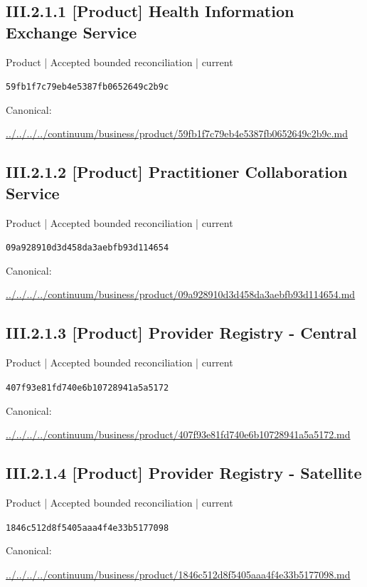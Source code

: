 \documentclass[10pt,a4paper]{article}
\begin{document}
\subsection*{III.2.1.1 [Product] Health Information Exchange Service}
\label{element-59fb1f7c79eb4e5387fb0652649c2b9c}
{\small Product | Accepted bounded reconciliation | current}\par
\texttt{59fb1f7c79eb4e5387fb0652649c2b9c}\par
Canonical: \par
{\footnotesize\url{../../../../continuum/business/product/59fb1f7c79eb4e5387fb0652649c2b9c.md}}\par
\subsection*{III.2.1.2 [Product] Practitioner Collaboration Service}
\label{element-09a928910d3d458da3aebfb93d114654}
{\small Product | Accepted bounded reconciliation | current}\par
\texttt{09a928910d3d458da3aebfb93d114654}\par
Canonical: \par
{\footnotesize\url{../../../../continuum/business/product/09a928910d3d458da3aebfb93d114654.md}}\par
\subsection*{III.2.1.3 [Product] Provider Registry - Central}
\label{element-407f93e81fd740e6b10728941a5a5172}
{\small Product | Accepted bounded reconciliation | current}\par
\texttt{407f93e81fd740e6b10728941a5a5172}\par
Canonical: \par
{\footnotesize\url{../../../../continuum/business/product/407f93e81fd740e6b10728941a5a5172.md}}\par
\subsection*{III.2.1.4 [Product] Provider Registry - Satellite}
\label{element-1846c512d8f5405aaa4f4e33b5177098}
{\small Product | Accepted bounded reconciliation | current}\par
\texttt{1846c512d8f5405aaa4f4e33b5177098}\par
Canonical: \par
{\footnotesize\url{../../../../continuum/business/product/1846c512d8f5405aaa4f4e33b5177098.md}}\par
\end{document}

